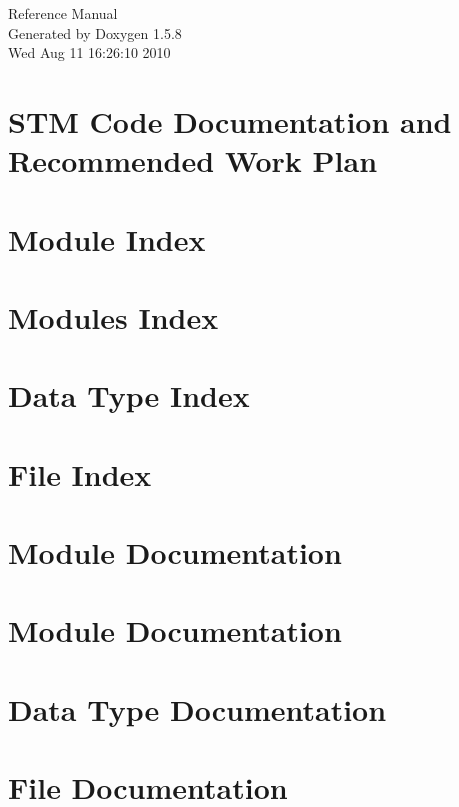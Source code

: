 \documentclass[letterpaper]{book}
\begin{document}
\begin{titlepage}
\vspace*{7cm}
\begin{center}
{\Large Reference Manual}\\
\vspace*{1cm}
{\large Generated by Doxygen 1.5.8}\\
\vspace*{0.5cm}
{\small Wed Aug 11 16:26:10 2010}\\
\end{center}
\end{titlepage}
\clearemptydoublepage
{}
\tableofcontents
\clearemptydoublepage
{}
\chapter{STM Code Documentation and Recommended Work Plan}
\label{index}\hypertarget{index}{}
\chapter{Module Index}

\chapter{Modules Index}

\chapter{Data Type Index}

\chapter{File Index}

\chapter{Module Documentation}


\chapter{Module Documentation}












































\chapter{Data Type Documentation}




\chapter{File Documentation}

\printindex
\end{document}
